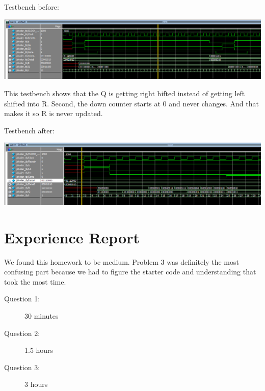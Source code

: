 \documentclass[12pt]{article}
\newenvironment{explanation}{\begin{tcolorbox}[colback=blue!2!white,colframe=blue!20!white]}{\end{tcolorbox}}
\begin{document}
        
        
    \section{}
        \begin{explanation}
            Testbench before:
            \begin{center}
                \includegraphics[scale = 0.47]{Images/before.PNG}
            \end{center}
            This testbench shows that the Q is getting right hifted instead of getting left shifted into R. Second, the down counter starts at 0 and never changes. And that makes it so R is never updated.

            Testbench after:
            \begin{center}
                \includegraphics[scale = 0.5]{Images/after.PNG}
            \end{center}
        \end{explanation}

        
        

    \section{Experience Report}
        We found this homework to be medium. Problem 3 was definitely the most confusing part because we had to figure the starter code and understanding that took the most time. 
        \begin{description}
            \item[Question 1:] 30 minutes
            \item[Question 2:] 1.5 hours
            \item[Question 3:] 3 hours
        \end{description}        
\end{document}
